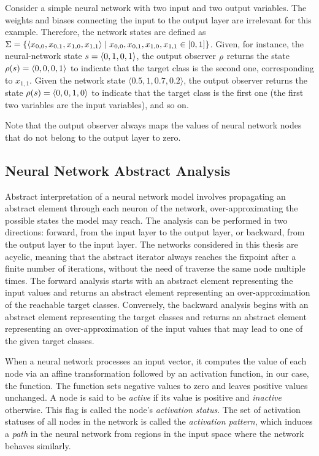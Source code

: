 \begin{example}
Consider a simple neural network with two input and two output variables. The weights and biases connecting the input to the output layer are irrelevant for this example. Therefore, the network states are defined as $\Sigma = \{\langle x_{0, 0}, x_{0, 1}, x_{1, 0}, x_{1, 1} \rangle \mid x_{0, 0}, x_{0, 1}, x_{1, 0}, x_{1, 1} \in [0,1]\}$.
Given, for instance, the neural-network state $s=\langle 0, 1, 0, 1 \rangle$, the output observer $\rho$ returns the state $\rho(s) = \langle 0, 0, 0, 1 \rangle$ to indicate that the target class is the second one, corresponding to $x_{1, 1}$. Given the network state $\langle 0.5, 1, 0.7, 0.2 \rangle$, the output observer returns the state $\rho(s) = \langle 0, 0, 1, 0 \rangle$ to indicate that the target class is the first one (the first two variables are the input variables), and so on.
\end{example}

Note that the output observer always maps the values of neural network nodes that do not belong to the output layer to zero.

\subsection{Neural Network Abstract Analysis}

Abstract interpretation of a neural network model involves propagating an abstract element through each neuron of the network, over-approximating the possible states the model may reach. The analysis can be performed in two directions: forward, from the input layer to the output layer, or backward, from the output layer to the input layer.
The networks considered in this thesis are acyclic, meaning that the abstract iterator always reaches the fixpoint after a finite number of iterations, without the need of traverse the same node multiple times.
The forward analysis starts with an abstract element representing the input values and returns an abstract element representing an over-approximation of the reachable target classes. Conversely, the backward analysis begins with an abstract element representing the target classes and returns an abstract element representing an over-approximation of the input values that may lead to one of the given target classes.

When a neural network processes an input vector, it computes the value of each node via an affine transformation followed by an activation function, in our case, the \relu{} function. The \relu{} function sets negative values to zero and leaves positive values unchanged. A node is said to be \emph{active} if its value is positive and \emph{inactive} otherwise. This flag is called the node's \emph{activation status}. The set of activation statuses of all nodes in the network is called the \emph{activation pattern}, which induces a \emph{path} in the neural network from
regions in the input space where the network behaves similarly.



